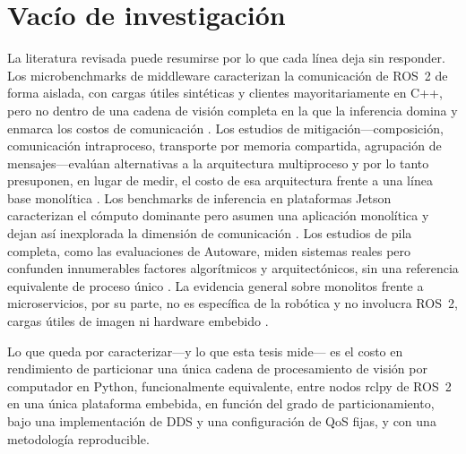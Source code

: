 \section{Vacío de investigación}
\label{sec:gap}

La literatura revisada puede resumirse por lo que cada línea deja sin
responder. Los microbenchmarks de middleware caracterizan la comunicación de
ROS~2 de forma aislada, con cargas útiles sintéticas y clientes
mayoritariamente en C++, pero no dentro de una cadena de visión completa en
la que la inferencia domina y enmarca los costos de comunicación
\cite{maruyama2016, kronauer2021, kamiya2025,luo2025, macenski2022}. Los
estudios de mitigación---composición, comunicación intraproceso,
transporte por memoria compartida, agrupación de mensajes---evalúan
alternativas a la arquitectura multiproceso y por lo tanto presuponen, en
lugar de medir, el costo de esa arquitectura frente a una línea base
monolítica \cite{macenski2023, kamiya2025, luo2025}. Los benchmarks de
inferencia en plataformas Jetson caracterizan el cómputo dominante pero
asumen una aplicación monolítica y dejan así inexplorada la dimensión de
comunicación \cite{szegedi2026, zequn2026, alqahtani2026, scalcon2024}. Los
estudios de pila completa, como las evaluaciones de Autoware, miden
sistemas reales pero confunden innumerables factores algorítmicos y
arquitectónicos, sin una referencia equivalente de proceso único
\cite{betz2023a, betz2024}. La evidencia general sobre monolitos frente a
microservicios, por su parte, no es específica de la robótica y no involucra
ROS~2, cargas útiles de imagen ni hardware embebido \cite{tapia2020,
blinowski2022, felisberto2024}.

Lo que queda por caracterizar---y lo que esta tesis mide--- es el costo en
rendimiento de particionar una única cadena de procesamiento de visión por
computador en Python, funcionalmente equivalente, entre nodos rclpy de
ROS~2 en una única plataforma embebida, en función del grado de
particionamiento, bajo una implementación de DDS y una configuración de QoS
fijas, y con una metodología reproducible.
